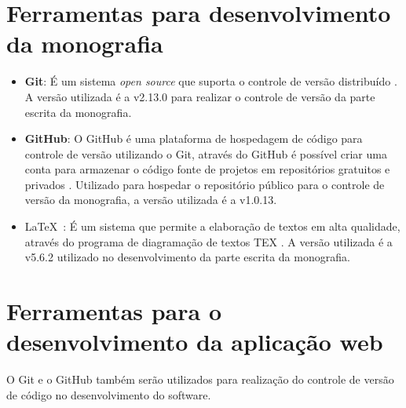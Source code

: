 \section{Ferramentas para desenvolvimento da monografia}
\label{sec:ferramentasDesenvolvimento}

\begin{itemize}
	
	\item \textbf{Git}: É um sistema \textit{open source} que suporta o controle de versão distribuído \cite{git}. A versão utilizada é a v2.13.0 para realizar o controle de versão da parte escrita da monografia. 
	
	\item \textbf{GitHub}: O GitHub é uma plataforma de hospedagem de código para controle de versão utilizando o Git, através do GitHub é possível criar uma conta para armazenar o código fonte de projetos em repositórios gratuitos e privados \cite{github}. Utilizado para hospedar o repositório público para o controle de versão da monografia, a versão utilizada é a v1.0.13.
	
	\item \LaTeX\ : É um sistema que permite a elaboração de textos em alta qualidade, através do programa de diagramação de textos TEX \cite{latex}. A versão utilizada é a v5.6.2 utilizado no desenvolvimento da parte escrita da monografia. 
	
\end{itemize}

\section{Ferramentas para o desenvolvimento da aplicação web}
\label{sec:ferramentasParaDesenvolvimentoWebApp}

O Git e o GitHub também serão utilizados para realização do controle de versão de código no desenvolvimento do software.

